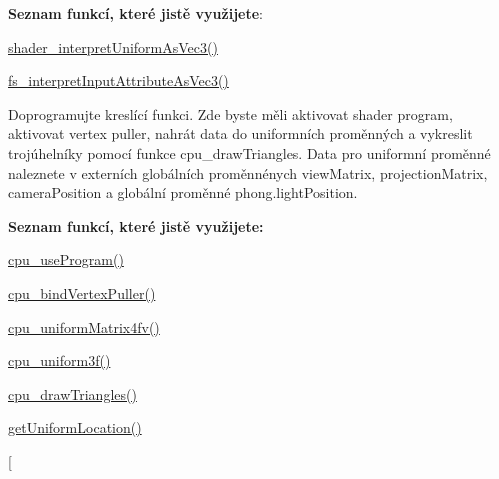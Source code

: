 \begin{DoxyRefList}
 {\bfseries Seznam funkcí, které jistě využijete}\-:
\begin{DoxyItemize}
\item \hyperlink{uniforms_8h_a0466fe65842b5a08561b87670f366f55}{shader\-\_\-interpret\-Uniform\-As\-Vec3()}
\item \hyperlink{program_8h_a132afaeef0a64d93305bb2df3f35a524}{fs\-\_\-interpret\-Input\-Attribute\-As\-Vec3()}  
\end{DoxyItemize}
\item[\label{todo__todo000002}%
\hypertarget{todo__todo000002}{}%
Global \hyperlink{group__cpu__side_gafea3b0614db94d611ae817685375c39c}{phong\-\_\-on\-Draw} (S\-D\-L\-\_\-\-Surface $\ast$surface)]Doprogramujte kreslící funkci. Zde byste měli aktivovat shader program, aktivovat vertex puller, nahrát data do uniformních proměnných a vykreslit trojúhelníky pomocí funkce cpu\-\_\-draw\-Triangles. Data pro uniformní proměnné naleznete v externích globálních proměnnénych view\-Matrix, projection\-Matrix, camera\-Position a globální proměnné phong.\-light\-Position.\par
 {\bfseries Seznam funkcí, které jistě využijete\-:}
\begin{DoxyItemize}
\item \hyperlink{program_8h_a497d97730640942bffcc3cd9f266f146}{cpu\-\_\-use\-Program()}
\item \hyperlink{vertexPuller_8h_a27eee6237125ddc21c7d9b996f5af84e}{cpu\-\_\-bind\-Vertex\-Puller()}
\item \hyperlink{uniforms_8h_a44cfae8c541efcc181e3947511df7f7a}{cpu\-\_\-uniform\-Matrix4fv()}
\item \hyperlink{uniforms_8h_abe070ee9f74f785a07118788fcf4219e}{cpu\-\_\-uniform3f()}
\item \hyperlink{student__pipeline_8c_aa47deaa10ce52221ab24e864a11426af}{cpu\-\_\-draw\-Triangles()}
\item \hyperlink{uniforms_8h_a6ea94982618b1c339a97a528b0670a53}{get\-Uniform\-Location()}  
\end{DoxyItemize}
\item[\label{todo__todo000001}%
\hypertarget{todo__todo000001}{}%

\end{DoxyRefList}
